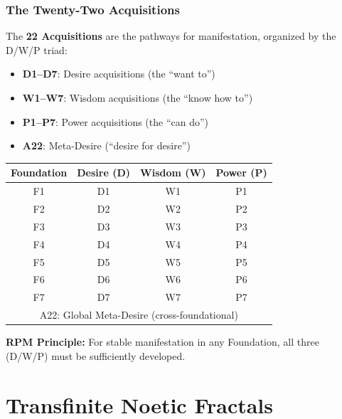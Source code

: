 \documentclass[11pt,twoside,openright]{book}
\theoremstyle{definition}
\theoremstyle{plain}
\theoremstyle{remark}
\begin{document}
\section{The Twenty-Two Acquisitions}
\label{sec:acquisitions}

The \textbf{22 Acquisitions} are the pathways for manifestation, organized by the D/W/P triad:

\begin{itemize}
  \item \textbf{D1--D7}: Desire acquisitions (the ``want to'')
  \item \textbf{W1--W7}: Wisdom acquisitions (the ``know how to'')
  \item \textbf{P1--P7}: Power acquisitions (the ``can do'')
  \item \textbf{A22}: Meta-Desire (``desire for desire'')
\end{itemize}

\begin{center}
\begin{tabular}{c|ccc}
\toprule
\textbf{Foundation} & \textbf{Desire (D)} & \textbf{Wisdom (W)} & \textbf{Power (P)} \\
\midrule
F1 & D1 & W1 & P1 \\
F2 & D2 & W2 & P2 \\
F3 & D3 & W3 & P3 \\
F4 & D4 & W4 & P4 \\
F5 & D5 & W5 & P5 \\
F6 & D6 & W6 & P6 \\
F7 & D7 & W7 & P7 \\
\midrule
\multicolumn{4}{c}{A22: Global Meta-Desire (cross-foundational)} \\
\bottomrule
\end{tabular}
\end{center}

\textbf{RPM Principle:} For stable manifestation in any Foundation, all three (D/W/P) must be sufficiently developed.

\part{Transfinite Noetic Fractals}
\label{part:math-track}


\end{document}
